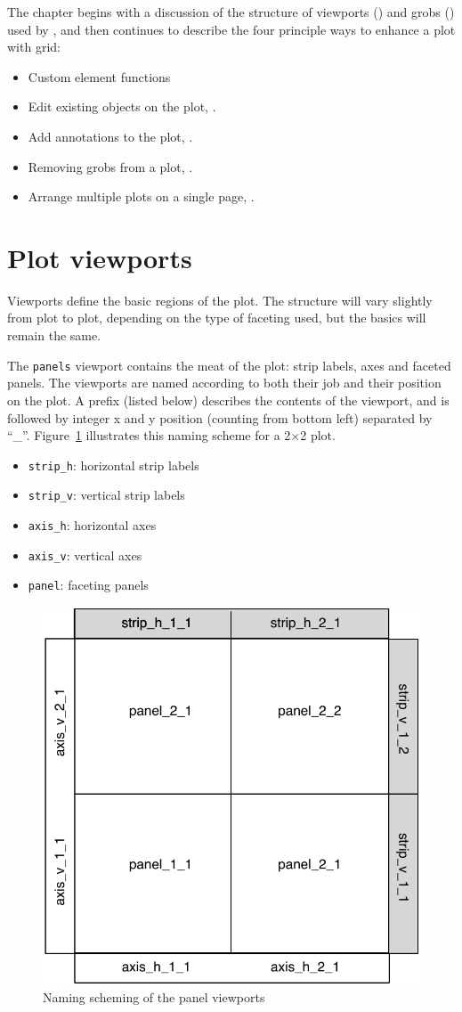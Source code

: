 The chapter begins with a discussion of the structure of viewports () and grobs () used by \ggplot, and then continues to describe the four principle ways to enhance a plot with grid:

\begin{itemize}
  \item Custom element functions
  \item Edit existing objects on the plot, .
  \item Add annotations to the plot, .
  \item Removing grobs from a plot, .
  \item Arrange multiple plots on a single page, .
\end{itemize}

\section{Plot viewports}
\label{sec:plot-viewports}

Viewports define the basic regions of the plot.  The structure will vary slightly from plot to plot, depending on the type of faceting used, but the basics will remain the same. 

The {\tt panels} viewport contains the meat of the plot: strip labels, axes and faceted panels.  The viewports are named according to both their job and their position on the plot.  A prefix (listed below) describes the contents of the viewport, and is followed by integer x and y position (counting from bottom left) separated by ``\_''.  Figure~\ref{fig:panelvp} illustrates this naming scheme for a 2$\times$2 plot.

\begin{itemize}
  \item {\tt strip\_h}: horizontal strip labels
  \item {\tt strip\_v}: vertical strip labels
  \item {\tt axis\_h}: horizontal axes
  \item {\tt axis\_v}: vertical axes
  \item {\tt panel}: faceting panels
\end{itemize}

\begin{figure}[htbp]
  \centering
    \includegraphics[width=0.5 \textwidth]{grid-panelvp}
  \caption{Naming scheming of the panel viewports}
  \label{fig:panelvp}
\end{figure}

